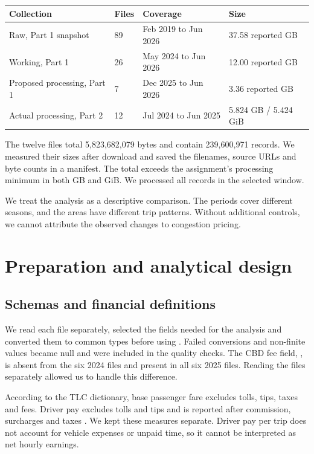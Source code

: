\documentclass[10pt,a4paper]{article}
\newcommand{\field}[1]{\texttt{\detokenize{#1}}}
\begin{document}
\begin{center}
\small
\begin{tabular}{@{}llll@{}}
\toprule
Collection & Files & Coverage & Size\\
\midrule
Raw, Part 1 snapshot & 89 & Feb 2019 to Jun 2026 & 37.58 reported GB\\
Working, Part 1 & 26 & May 2024 to Jun 2026 & 12.00 reported GB\\
Proposed processing, Part 1 & 7 & Dec 2025 to Jun 2026 & 3.36 reported GB\\
Actual processing, Part 2 & 12 & Jul 2024 to Jun 2025 & 5.824 GB / 5.424 GiB\\
\bottomrule
\end{tabular}
\end{center}

The twelve files total 5,823,682,079 bytes and contain 239,600,971 records. We measured their sizes after download and saved the filenames, source URLs and byte counts in a manifest. The total exceeds the assignment's processing minimum \cite{brief} in both GB and GiB. We processed all records in the selected window.

We treat the analysis as a descriptive comparison. The periods cover different seasons, and the areas have different trip patterns. Without additional controls, we cannot attribute the observed changes to congestion pricing.

\section{Preparation and analytical design}

\subsection{Schemas and financial definitions}

We read each file separately, selected the fields needed for the analysis and converted them to common types before using \field{unionByName}. Failed conversions and non-finite values became null and were included in the quality checks. The CBD fee field, \field{cbd_congestion_fee}, is absent from the six 2024 files and present in all six 2025 files. Reading the files separately allowed us to handle this difference.

According to the TLC dictionary, base passenger fare excludes tolls, tips, taxes and fees. Driver pay excludes tolls and tips and is reported after commission, surcharges and taxes \cite{dictionary}. We kept these measures separate. Driver pay per trip does not account for vehicle expenses or unpaid time, so it cannot be interpreted as net hourly earnings.
\end{document}
